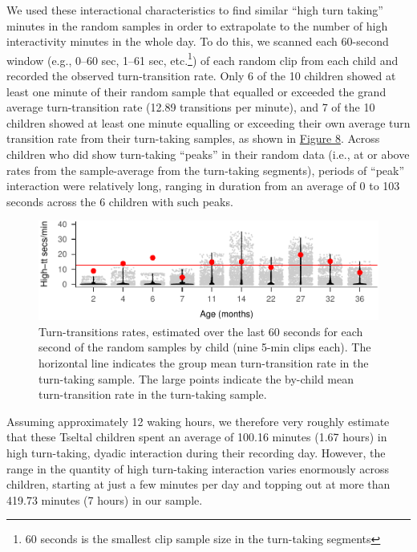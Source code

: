 \documentclass[floatsintext,man]{apa6}
\theoremstyle{definition}
\theoremstyle{definition}
\theoremstyle{definition}
\theoremstyle{remark}
\begin{document}
We used these interactional characteristics to find similar
\enquote{high turn taking} minutes in the random samples in order to
extrapolate to the number of high interactivity minutes in the whole
day. To do this, we scanned each 60-second window (e.g., 0--60 sec,
1--61 sec, etc.\footnote{60 seconds is the smallest clip sample size in
  the turn-taking segments}) of each random clip from each child and
recorded the observed turn-transition rate. Only 6 of the 10 children
showed at least one minute of their random sample that equalled or
exceeded the grand average turn-transition rate (12.89 transitions per
minute), and 7 of the 10 children showed at least one minute equalling
or exceeding their own average turn transition rate from their
turn-taking samples, as shown in \protect\hyperlink{fig8}{Figure 8}.
Across children who did show turn-taking \enquote{peaks} in their random
data (i.e., at or above rates from the sample-average from the
turn-taking segments), periods of \enquote{peak} interaction were
relatively long, ranging in duration from an average of 0 to 103 seconds
across the 6 children with such peaks.

\begin{figure}
\centering
\includegraphics{Tseltal-CLE_files/figure-latex/fig8-1.pdf}
\caption{\label{fig:fig8}Turn-transitions rates, estimated over the last 60
seconds for each second of the random samples by child (nine 5-min clips
each). The horizontal line indicates the group mean turn-transition rate
in the turn-taking sample. The large points indicate the by-child mean
turn-transition rate in the turn-taking sample.}
\end{figure}

Assuming approximately 12 waking hours, we therefore very roughly
estimate that these Tseltal children spent an average of 100.16 minutes
(1.67 hours) in high turn-taking, dyadic interaction during their
recording day. However, the range in the quantity of high turn-taking
interaction varies enormously across children, starting at just a few
minutes per day and topping out at more than 419.73 minutes (7 hours) in
our sample.
\end{document}
